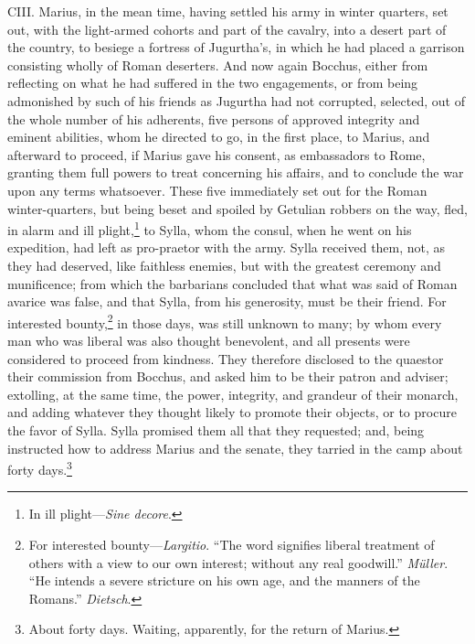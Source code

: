 CIII. Marius, in the mean time, having settled his army in winter
quarters, set out, with the light-armed cohorts and part of the
cavalry, into a desert part of the country, to besiege a fortress of
Jugurtha's, in which he had placed a garrison consisting wholly of
Roman deserters. And now again Bocchus, either from reflecting on what
he had suffered in the two engagements, or from being admonished by
such of his friends as Jugurtha had not corrupted, selected, out of
the whole number of his adherents, five persons of approved integrity
and eminent abilities, whom he directed to go, in the first place, to
Marius, and afterward to proceed, if Marius gave his consent, as
embassadors to Rome, granting them full powers to treat concerning his
affairs, and to conclude the war upon any terms whatsoever. These five
immediately set out for the Roman winter-quarters, but being beset and
spoiled by Getulian robbers on the way, fled, in alarm and ill
plight,\footnote{In ill plight—\emph{Sine decore}.} to Sylla, whom the consul, when he went on his expedition,
had left as pro-praetor with the army. Sylla received them, not, as they
had deserved, like faithless enemies, but with the greatest ceremony and
munificence; from which the barbarians concluded that what was said of
Roman avarice was false, and that Sylla, from his generosity, must be
their friend. For interested bounty,\footnote{For interested bounty—\emph{Largitio}. ``The word signifies liberal
treatment of others with a view to our own interest; without any real
goodwill.'' \emph{Müller}. ``He intends a severe stricture on his own age,
and the manners of the Romans.'' \emph{Dietsch}.} in those days, was still
unknown to many; by whom every man who was liberal was also thought
benevolent, and all presents were considered to proceed from kindness.
They therefore disclosed to the quaestor their commission from Bocchus,
and asked him to be their patron and adviser; extolling, at the same
time, the power, integrity, and grandeur of their monarch, and adding
whatever they thought likely to promote their objects, or to procure
the favor of Sylla. Sylla promised them all that they requested; and,
being instructed how to address Marius and the senate, they tarried in
the camp about forty days.\footnote{About forty days. Waiting, apparently, for the return of Marius.}

